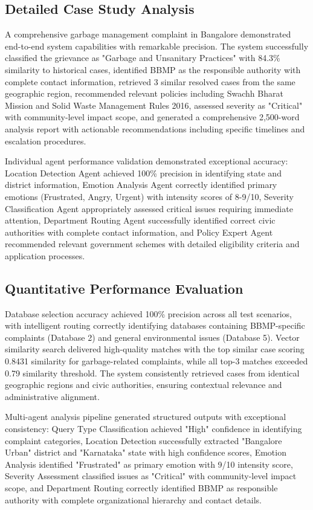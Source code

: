 \documentclass[conference]{IEEEtran}
\begin{document}
\subsection{Detailed Case Study Analysis}

A comprehensive garbage management complaint in Bangalore demonstrated end-to-end system capabilities with remarkable precision. The system successfully classified the grievance as "Garbage and Unsanitary Practices" with 84.3\% similarity to historical cases, identified BBMP as the responsible authority with complete contact information, retrieved 3 similar resolved cases from the same geographic region, recommended relevant policies including Swachh Bharat Mission and Solid Waste Management Rules 2016, assessed severity as "Critical" with community-level impact scope, and generated a comprehensive 2,500-word analysis report with actionable recommendations including specific timelines and escalation procedures.

Individual agent performance validation demonstrated exceptional accuracy: Location Detection Agent achieved 100\% precision in identifying state and district information, Emotion Analysis Agent correctly identified primary emotions (Frustrated, Angry, Urgent) with intensity scores of 8-9/10, Severity Classification Agent appropriately assessed critical issues requiring immediate attention, Department Routing Agent successfully identified correct civic authorities with complete contact information, and Policy Expert Agent recommended relevant government schemes with detailed eligibility criteria and application processes.

\subsection{Quantitative Performance Evaluation}

Database selection accuracy achieved 100\% precision across all test scenarios, with intelligent routing correctly identifying databases containing BBMP-specific complaints (Database 2) and general environmental issues (Database 5). Vector similarity search delivered high-quality matches with the top similar case scoring 0.8431 similarity for garbage-related complaints, while all top-3 matches exceeded 0.79 similarity threshold. The system consistently retrieved cases from identical geographic regions and civic authorities, ensuring contextual relevance and administrative alignment.

Multi-agent analysis pipeline generated structured outputs with exceptional consistency: Query Type Classification achieved "High" confidence in identifying complaint categories, Location Detection successfully extracted "Bangalore Urban" district and "Karnataka" state with high confidence scores, Emotion Analysis identified "Frustrated" as primary emotion with 9/10 intensity score, Severity Assessment classified issues as "Critical" with community-level impact scope, and Department Routing correctly identified BBMP as responsible authority with complete organizational hierarchy and contact details.
\end{document}
